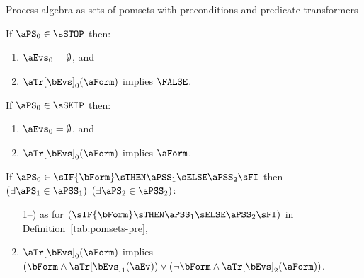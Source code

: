 
Process algebra as sets of pomsets with preconditions and predicate
transformers
\begin{definition}
  If $\aPS_0\in\sSTOP$ then:
  \begin{enumerate}
    \item $\aEvs_0 = \emptyset$, and
  \item $\aTr[\bEvs]_0(\aForm)$ implies $\FALSE$.
  \end{enumerate}

  \noindent
  If $\aPS_0\in\sSKIP$ then:
  \begin{enumerate}
  \item $\aEvs_0 = \emptyset$, and
  \item $\aTr[\bEvs]_0(\aForm)$ implies $\aForm$.
  \end{enumerate}

  \noindent
  If $\aPS_0 \in \sIF{\bForm}\sTHEN\aPSS_1\sELSE\aPSS_2\sFI$ then
  $(\exists\aPS_1\in\aPSS_1)$ $(\exists\aPS_2\in\aPSS_2)$:
  \begin{enumerate}
  \setcounter{enumi}{\value{pomsetPreIfXount}}
  \item[1--\thepomsetPreIfXount)] as for $(\sIF{\bForm}\sTHEN\aPSS_1\sELSE\aPSS_2\sFI)$ in Definition~\ref{tab:pomsets-pre},
  \item $\aTr[\bEvs]_0(\aForm)$ implies $(\bForm\land\aTr[\bEvs]_1(\aEv))\lor(\neg\bForm\land\aTr[\bEvs]_2(\aForm))$.
  \end{enumerate}


\end{definition}
